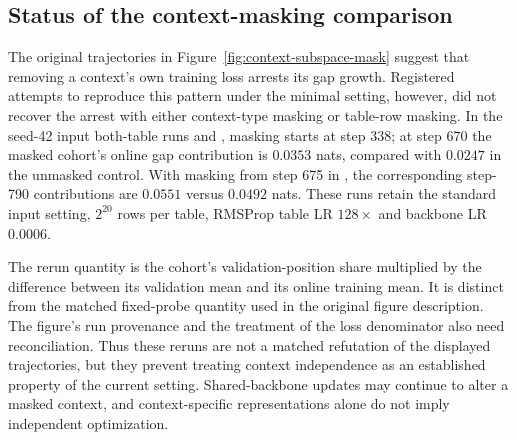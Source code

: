 \subsection{Status of the context-masking comparison}
\label{app:mask-reconciliation}

The original trajectories in Figure~\ref{fig:context-subspace-mask} suggest that removing a context's own training loss arrests its gap growth. Registered attempts to reproduce this pattern under the minimal setting, however, did not recover the arrest with either context-type masking or table-row masking. In the seed-42 input both-table runs  and , masking starts at step 338; at step 670 the masked cohort's online gap contribution is $0.0353$ nats, compared with $0.0247$ in the unmasked control. With masking from step 675 in , the corresponding step-790 contributions are $0.0551$ versus $0.0492$ nats. These runs retain the standard input setting, $2^{20}$ rows per table, RMSProp table LR $128\times$ and backbone LR $0.0006$.

The rerun quantity is the cohort's validation-position share multiplied by the difference between its validation mean and its online training mean. It is distinct from the matched fixed-probe quantity used in the original figure description. The figure's run provenance and the treatment of the loss denominator also need reconciliation. Thus these reruns are not a matched refutation of the displayed trajectories, but they prevent treating context independence as an established property of the current setting. Shared-backbone updates may continue to alter a masked context, and context-specific representations alone do not imply independent optimization.

